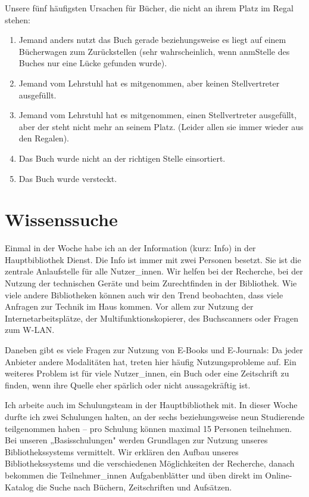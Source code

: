 \documentclass[a4paper,
fontsize=11pt,
oneside,
numbers=noperiodatend,
parskip=half-,
bibliography=totoc,
final
]{scrartcl}
\begin{document}
Unsere fünf häufigsten Ursachen für Bücher, die nicht an ihrem Platz im
Regal stehen:

\begin{enumerate}
\def\labelenumi{\arabic{enumi}.}
\item
  Jemand anders nutzt das Buch gerade beziehungsweise es liegt auf einem
  Bücherwagen zum Zurückstellen (sehr wahrscheinlich, wenn anmStelle des
  Buches nur eine Lücke gefunden wurde).
\item
  Jemand vom Lehrstuhl hat es mitgenommen, aber keinen Stellvertreter
  ausgefüllt.
\item
  Jemand vom Lehrstuhl hat es mitgenommen, einen Stellvertreter
  ausgefüllt, aber der steht nicht mehr an seinem Platz. (Leider allen
  sie immer wieder aus den Regalen).
\item
  Das Buch wurde nicht an der richtigen Stelle einsortiert.
\item
  Das Buch wurde versteckt.
\end{enumerate}

\hypertarget{wissenssuche}{%
\section*{Wissenssuche}\label{wissenssuche}}

Einmal in der Woche habe ich an der Information (kurz: Info) in der
Hauptbibliothek Dienst. Die Info ist immer mit zwei Personen besetzt.
Sie ist die zentrale Anlaufstelle für alle Nutzer\_innen. Wir helfen bei
der Recherche, bei der Nutzung der technischen Geräte und beim
Zurechtfinden in der Bibliothek. Wie viele andere Bibliotheken können
auch wir den Trend beobachten, dass viele Anfragen zur Technik im Haus
kommen. Vor allem zur Nutzung der Internetarbeitsplätze, der
Multifunktionskopierer, des Buchscanners oder Fragen zum W-LAN.

Daneben gibt es viele Fragen zur Nutzung von E-Books und E-Journals: Da
jeder Anbieter andere Modalitäten hat, treten hier häufig
Nutzungsprobleme auf. Ein weiteres Problem ist für viele Nutzer\_innen,
ein Buch oder eine Zeitschrift zu finden, wenn ihre Quelle eher spärlich
oder nicht aussagekräftig ist.

Ich arbeite auch im Schulungsteam in der Hauptbibliothek mit. In dieser
Woche durfte ich zwei Schulungen halten, an der sechs beziehungsweise
neun Studierende teilgenommen haben -- pro Schulung können maximal 15
Personen teilnehmen. Bei unseren „Basisschulungen" werden Grundlagen zur
Nutzung unseres Bibliothekssystems vermittelt. Wir erklären den Aufbau
unseres Bibliothekssystems und die verschiedenen Möglichkeiten der
Recherche, danach bekommen die Teilnehmer\_innen Aufgabenblätter und
üben direkt im Online-Katalog die Suche nach Büchern, Zeitschriften und
Aufsätzen.
\end{document}
